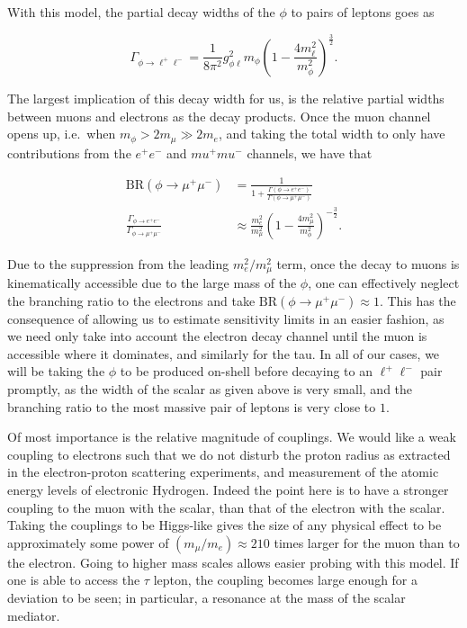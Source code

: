 With this model, the partial decay widths of the $\phi$ to pairs of leptons goes as

\begin{equation}
    \Gamma_{\phi \rightarrow \ell^+ \ell^-} = \frac{1}{8\pi^2} g_{\phi\ell}^2 m_\phi \left(1-\frac{4m_\ell^2}{m_\phi^2}\right)^{\frac{3}{2}}\textrm{.}
\end{equation}

\noindent The largest implication of this decay width for us, is the relative partial widths between muons and electrons as the decay products.
Once the muon channel opens up, i.e.\ when $m_\phi > 2 m_\mu \gg 2 m_e$, and taking the total width to only have contributions from the $e^+ e^-$ and $mu^+ mu^-$ channels, we have that

\begin{align}
    \textrm{BR}(\phi \rightarrow \mu^+ \mu^-) &= \frac{1}{1+\frac{\Gamma\left(\phi \rightarrow e^+ e^-\right)}{\Gamma\left(\phi \rightarrow \mu^+ \mu^-\right)}} \\
    \frac{\Gamma_{\phi \rightarrow e^+ e^-}}{\Gamma_{\phi \rightarrow \mu^+ \mu^-}} &\approx \frac{m_e^2}{m_\mu^2}\left(1-\frac{4m_\mu^2}{m_\phi^2}\right)^{-\frac{3}{2}}\textrm{.}
\end{align}

\noindent Due to the suppression from the leading $m_e^2/m_\mu^2$ term, once the decay to muons is kinematically accessible due to the large mass of the $\phi$, one can effectively neglect the branching ratio to the electrons and take $\textrm{BR}(\phi \rightarrow \mu^+ \mu^-) \approx 1$.
This has the consequence of allowing us to estimate sensitivity limits in an easier fashion, as we need only take into account the electron decay channel until the muon is accessible where it dominates, and similarly for the tau.
In all of our cases, we will be taking the $\phi$ to be produced on-shell before decaying to an $\ell^+ \ell^-$ pair promptly, as the width of the scalar as given above is very small, and the branching ratio to the most massive pair of leptons is very close to $1$.

Of most importance is the relative magnitude of couplings.
We would like a weak coupling to electrons such that we do not disturb the proton radius as extracted in the electron-proton scattering experiments, and measurement of the atomic energy levels of electronic Hydrogen.
Indeed the point here is to have a stronger coupling to the muon with the scalar, than that of the electron with the scalar.
Taking the couplings to be Higgs-like gives the size of any physical effect to be approximately some power of $(m_\mu/m_e) \approx 210$ times larger for the muon than to the electron.
Going to higher mass scales allows easier probing with this model.
If one is able to access the $\tau$ lepton, the coupling becomes large enough for a deviation to be seen; in particular, a resonance at the mass of the scalar mediator.

